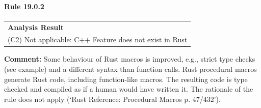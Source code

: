 \paragraph{Rule 19.0.2}
\begin{longtable}{p{13cm}}
\textbf{Analysis Result} \\
(C2) Not applicable: C++ Feature does not exist in Rust \\
\end{longtable}
\textbf{Comment:} Some behaviour of Rust macros is improved, e.g., strict type checks (see example) and a different syntax than function calls. Rust procedural macros generate Rust code, including function-like macros. The resulting code is type checked and compiled as if a human would have written it. The rationale of the rule does not apply (`Rust Reference: Procedural Macros p. 47/432'). \\


